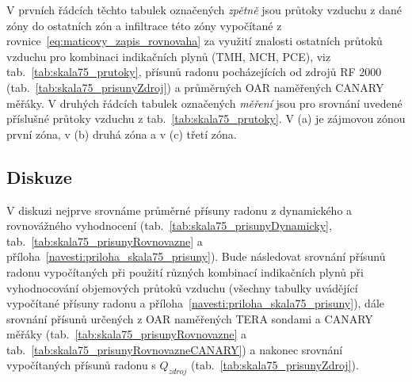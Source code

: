 \begin{table}[H]
    \small
    \centering
    \caption{\small V prvních řádcích těchto tabulek označených \emph{zpětně} jsou průtoky vzduchu z dané zóny do ostatních zón a infiltrace této zóny vypočítané z rovnice~\eqref{eq:maticovy_zapis_rovnovaha} za využití znalosti ostatních průtoků vzduchu pro kombinaci indikačních plynů (TMH, MCH, PCE), viz tab.~\ref{tab:skala75_prutoky}, přísunů radonu pocházejících od zdrojů RF 2000 (tab.~\ref{tab:skala75_prisunyZdroj}) a průměrných OAR naměřených CANARY měřáky. V druhých řádcích tabulek označených \emph{měření} jsou pro srovnání uvedené příslušné průtoky vzduchu z tab.~\ref{tab:skala75_prutoky}. V (a) je zájmovou zónou první zóna, v (b) druhá zóna a v (c) třetí zóna.}
    \label{tab:skala75_prutoky_zpetne}
    \begin{subtable}{\textwidth}
        \centering
        \caption{}
        
    \end{subtable}

    \begin{subtable}{\textwidth}
        \centering
        \caption{}
        
    \end{subtable}

    \begin{subtable}{\textwidth}
        \centering
        \caption{}
        
    \end{subtable}
\end{table}

\subsection{Diskuze}
V diskuzi nejprve srovnáme průměrné přísuny radonu z dynamického a rovnovážného vyhodnocení  (tab.~\ref{tab:skala75_prisunyDynamicky}, tab.~\ref{tab:skala75_prisunyRovnovazne} a příloha~\ref{navesti:priloha_skala75_prisuny}). Bude následovat srovnání přísunů radonu vypočítaných při použití různých kombinací indikačních plynů při vyhodnocování objemových průtoků vzduchu (všechny tabulky uvádějící vypočítané přísuny radonu a příloha~\ref{navesti:priloha_skala75_prisuny}), dále srovnání přísunů určených z OAR naměřených TERA sondami a CANARY měřáky (tab.~\ref{tab:skala75_prisunyRovnovazne} a tab.~\ref{tab:skala75_prisunyRovnovazneCANARY}) a nakonec srovnání vypočítaných přísunů radonu s $Q_{zdroj}$ (tab.~\ref{tab:skala75_prisunyZdroj}). 

